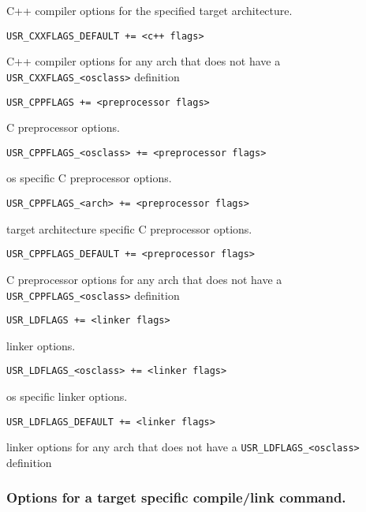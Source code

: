 \begin{description}
C++ compiler options for the specified target architecture.

\item \verb|USR_CXXFLAGS_DEFAULT += <c++ flags>|

C++ compiler options for any arch that does not have a \verb|USR_CXXFLAGS_<osclass>| definition

\item {}\verb|USR_CPPFLAGS += <preprocessor flags>|

C preprocessor options.

\item \verb|USR_CPPFLAGS_<osclass> += <preprocessor flags>|

os specific C preprocessor options.

\item \verb|USR_CPPFLAGS_<arch> += <preprocessor flags>|

target architecture specific C preprocessor options.

\item \verb|USR_CPPFLAGS_DEFAULT += <preprocessor flags>|

C preprocessor options for any arch that does not have a \verb|USR_CPPFLAGS_<osclass>| definition

\item {}\verb|USR_LDFLAGS += <linker flags>|

linker options.

\item \verb|USR_LDFLAGS_<osclass> += <linker flags>|

os specific linker options.

\item \verb|USR_LDFLAGS_DEFAULT += <linker flags>|

linker options for any arch that does not have a \verb|USR_LDFLAGS_<osclass>| definition

\end{description}

 

\subsubsection{Options for a target specific compile/link command.}

